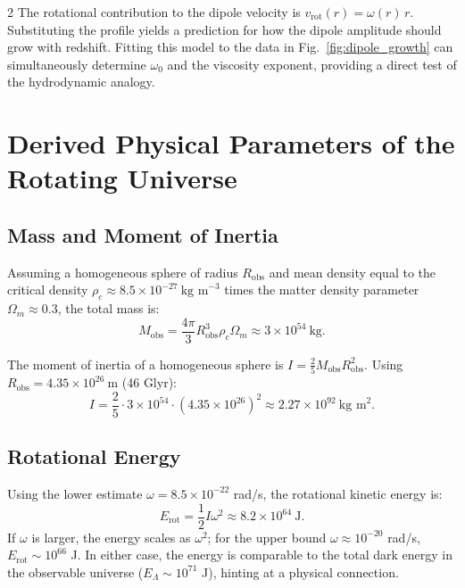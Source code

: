 \documentclass[12pt,a4paper]{article}
\begin{document}
\begin{multicols}{2}
		The rotational contribution to the dipole velocity is \(v_{\mathrm{rot}}(r) = \omega(r) \, r\). Substituting the profile yields a prediction for how the dipole amplitude should grow with redshift. Fitting this model to the data in Fig.~\ref{fig:dipole_growth} can simultaneously determine \(\omega_0\) and the viscosity exponent, providing a direct test of the hydrodynamic analogy.
		
		\section{Derived Physical Parameters of the Rotating Universe}
		
		\subsection{Mass and Moment of Inertia}
		
		Assuming a homogeneous sphere of radius \(R_{\text{obs}}\) and mean density equal to the critical density \(\rho_c \approx 8.5\times10^{-27}\ \text{kg m}^{-3}\) times the matter density parameter \(\Omega_m \approx 0.3\), the total mass is:
		\begin{equation}
			M_{\text{obs}} = \frac{4\pi}{3} R_{\text{obs}}^3 \rho_c \Omega_m \approx 3 \times 10^{54}\ \text{kg}.
		\end{equation}
		
		The moment of inertia of a homogeneous sphere is \(I = \frac{2}{5} M_{\text{obs}} R_{\text{obs}}^2\). Using \(R_{\text{obs}} = 4.35\times10^{26}\ \text{m}\) (46 Glyr):
		\begin{equation}
			I = \frac{2}{5} \cdot 3\times10^{54} \cdot (4.35\times10^{26})^2 \approx 2.27 \times 10^{92}\ \text{kg m}^2.
		\end{equation}
		
		\subsection{Rotational Energy}
		
		Using the lower estimate \(\omega = 8.5\times10^{-22}\) rad/s, the rotational kinetic energy is:
		\begin{equation}
			E_{\text{rot}} = \frac{1}{2} I \omega^2 \approx 8.2 \times 10^{64}\ \text{J}.
		\end{equation}
		If \(\omega\) is larger, the energy scales as \(\omega^2\); for the upper bound \(\omega \approx 10^{-20}\) rad/s, \(E_{\text{rot}} \sim 10^{66}\) J. In either case, the energy is comparable to the total dark energy in the observable universe (\(E_{\Lambda} \sim 10^{71}\) J), hinting at a physical connection.
		

\end{multicols}
\end{document}
